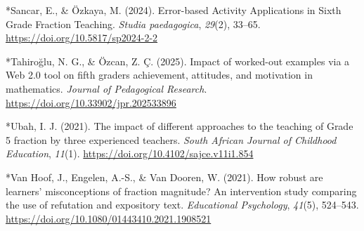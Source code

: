 \documentclass[man,a4paper,12pt,floatsintext,nolmodern,notab]{apa7}
\begin{document}
\par\noindent\hangindent=0.5in *Sancar, E., \& Özkaya, M. (2024). Error-based Activity Applications in Sixth Grade Fraction Teaching. \textit{Studia paedagogica}, \textit{29}(2), 33–65. \url{https://doi.org/10.5817/sp2024-2-2}\par
\par\noindent\hangindent=0.5in *Tahiroğlu, N. G., \& Özcan, Z. Ç. (2025). Impact of worked-out examples via a Web 2.0 tool on fifth graders achievement, attitudes, and motivation in mathematics. \textit{Journal of Pedagogical Research}. \url{https://doi.org/10.33902/jpr.202533896}\par
\par\noindent\hangindent=0.5in *Ubah, I. J. (2021). The impact of different approaches to the teaching of Grade 5 fraction by three experienced teachers. \textit{South African Journal of Childhood Education}, \textit{11}(1). \url{https://doi.org/10.4102/sajce.v11i1.854}\par
\par\noindent\hangindent=0.5in *Van Hoof, J., Engelen, A.-S., \& Van Dooren, W. (2021). How robust are learners’ misconceptions of fraction magnitude? An intervention study comparing the use of refutation and expository text. \textit{Educational Psychology}, \textit{41}(5), 524–543. \url{https://doi.org/10.1080/01443410.2021.1908521}\par
\end{document}
